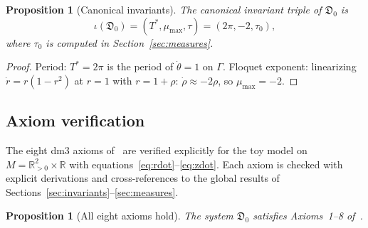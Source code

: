\documentclass[reqno]{amsart}
\numberwithin{equation}{section}
\theoremstyle{plain}
\newtheorem{proposition}[theorem]{Proposition}
\theoremstyle{definition}
\theoremstyle{remark}
\newcommand{\R}{\mathbb{R}}
\newcommand{\dm}{\mathfrak{D}}
\newcommand{\Orb}{\Gamma}
\begin{document}
\begin{proposition}[Canonical invariants]\label{prop:canonical}
The canonical invariant triple of $\dm_0$ is
\[
  \iota(\dm_0) = (T^*,\mu_{\max},\tau) = (2\pi,-2,\tau_0),
\]
where $\tau_0$ is computed in Section~\ref{sec:measures}.
\end{proposition}
\begin{proof}
Period: $T^*=2\pi$ is the period of $\dot\theta=1$ on $\Orb$.
Floquet exponent: linearizing $\dot r=r(1-r^2)$ at $r=1$ with
$r=1+\rho$: $\dot\rho\approx-2\rho$, so $\mu_{\max}=-2$.
\end{proof}

\subsection{Axiom verification}\label{subsec:axioms}

The eight dm3 axioms of~\cite{Paper1} are verified explicitly
for the toy model on $M=\R^2_{>0}\times\R$ with
equations~\eqref{eq:rdot}--\eqref{eq:zdot}. Each axiom is checked
with explicit derivations and cross-references to the global results
of Sections~\ref{sec:invariants}--\ref{sec:measures}.

\begin{proposition}[All eight axioms hold]\label{prop:axioms}
The system $\dm_0$ satisfies Axioms~1--8 of~\cite{Paper1}.
\end{proposition}
\end{document}
